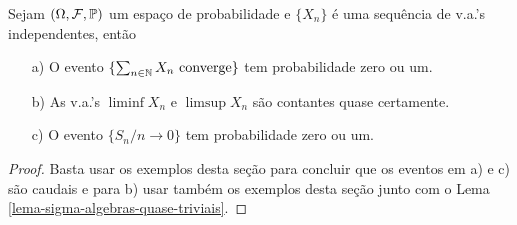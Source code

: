 \begin{corolario}
Sejam $(\Omega,\mathcal{F},\mathbb{P})$ um espaço de probabilidade e 
$\{X_n\}$ é uma sequência de v.a.'s independentes, 
então 
	\begin{itemize}
		\item[a)]
		O evento $\{ \sum_{n\in\mathbb{N}} X_n\ \text{converge}\}$ tem probabilidade
		zero ou um.		
		
		\item[b)]
		As v.a.'s $\liminf X_n$ e $\limsup X_n$ são contantes quase certamente.
		
		\item[c)]
		O evento $\{S_n/n\to 0\}$ tem probabilidade zero ou um.		
		
	\end{itemize}
\end{corolario}


\begin{proof}
Basta usar os exemplos desta seção para concluir que os eventos
em a) e c) são caudais e para b) usar também os exemplos desta
seção  junto com o Lema \ref{lema-sigma-algebras-quase-triviais}. 
\end{proof}



















